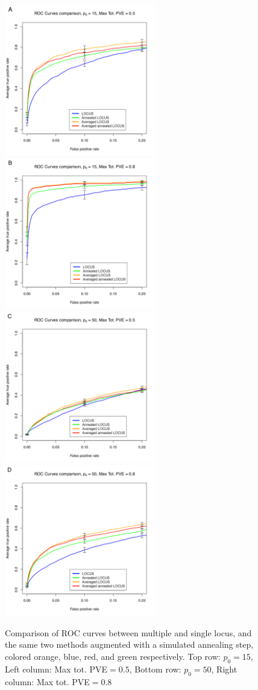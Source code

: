 \documentclass[a4paper, 11pt]{report}
\numberwithin{equation}{chapter}
\begin{document}
\begin{figure}[h!]
\includegraphics[width=2.6in, bb=0 0 500 500]{images/ROC_Comp_p0_15_var_0_5.pdf}
\includegraphics[width=2.6in, bb=0 0 500 500]{images/ROC_Comp_p0_15_var_0_8.pdf}
\includegraphics[width=2.6in, bb=0 0 500 500]{images/ROC_Comp_p0_50_var_0_5.pdf}
\includegraphics[width=2.6in, bb=0 0 500 500]{images/ROC_Comp_p0_50_var_0_8.pdf}
\caption{\label{fig:ROCComp}Comparison of ROC curves between multiple and single locus, and the same two methods augmented with a simulated annealing step, colored orange, blue, red, and green respectively. Top row: $p_0 = 15$, Left column: Max tot. PVE$ = 0.5$,
Bottom row: $p_0 = 50$, Right column: Max tot. PVE$ = 0.8$}
\end{figure}
\end{document}
